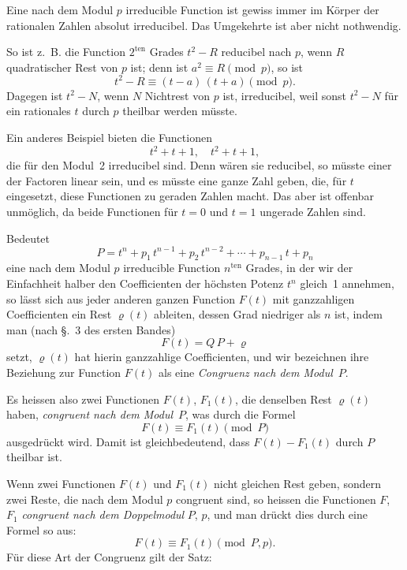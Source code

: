 \documentclass[12pt,a4paper]{article}
\begin{document}
Eine nach dem Modul $p$ irreducible Function ist gewiss immer im Körper der rationalen Zahlen absolut irreducibel. Das Umgekehrte ist aber nicht nothwendig.

So ist z.~B. die Function $2^{\text{ten}}$ Grades $t^{2} - R$ reducibel nach $p$, wenn $R$ quadratischer Rest von $p$ ist; denn ist $a^{2} \equiv R \pmod{p}$, so ist
\[
t^{2} - R \equiv (t-a)\,(t+a) \pmod{p}.
\]
Dagegen ist $t^{2} - N$, wenn $N$ Nichtrest von $p$ ist, irreducibel, weil sonst $t^{2} - N$ für ein rationales $t$ durch $p$ theilbar werden müsste.

Ein anderes Beispiel bieten die Functionen
\[
t^{2} + t + 1,\quad t^{2} + t + 1,
\]
die für den Modul~2 irreducibel sind. Denn wären sie reducibel, so müsste einer der Factoren linear sein, und es müsste eine ganze Zahl geben, die, für $t$ eingesetzt, diese Functionen zu geraden Zahlen macht. Das aber ist offenbar unmöglich, da beide Functionen für $t = 0$ und $t = 1$ ungerade Zahlen sind.

\newpage
{}

Bedeutet
\begin{equation}\label{eq:63.3}
\tag{3}
P = t^{n} + p_{1}\,t^{n-1} + p_{2}\,t^{n-2} + \cdots + p_{n-1}\,t + p_{n}
\end{equation}
eine nach dem Modul $p$ irreducible Function $n^{\text{ten}}$ Grades, in der wir der Einfachheit halber den Coefficienten der höchsten Potenz $t^{n}$ gleich~1 annehmen, so lässt sich aus jeder anderen ganzen Function $F(t)$ mit ganzzahligen Coefficienten ein Rest $\varrho(t)$ ableiten, dessen Grad niedriger als $n$ ist, indem man (nach \S.~3 des ersten Bandes)
\begin{equation}\label{eq:63.4}
\tag{4}
F(t) = Q\,P + \varrho
\end{equation}
setzt, $\varrho(t)$ hat hierin ganzzahlige Coefficienten, und wir bezeichnen ihre Beziehung zur Function $F(t)$ als eine \emph{Congruenz nach dem Modul}~$P$.

Es heissen also zwei Functionen $F(t)$, $F_{1}(t)$, die denselben Rest $\varrho(t)$ haben, \emph{congruent nach dem Modul}~$P$, was durch die Formel
\[
F(t) \equiv F_{1}(t) \pmod{P}
\]
ausgedrückt wird. Damit ist gleichbedeutend, dass $F(t) - F_{1}(t)$ durch $P$ theilbar ist.

Wenn zwei Functionen $F(t)$ und $F_{1}(t)$ nicht gleichen Rest geben, sondern zwei Reste, die nach dem Modul $p$ congruent sind, so heissen die Functionen $F$, $F_{1}$ \emph{congruent nach dem Doppelmodul} $P$, $p$, und man drückt dies durch eine Formel so aus:
\begin{equation}\label{eq:63.5}
\tag{5}
F(t) \equiv F_{1}(t) \pmod{P, p}.
\end{equation}
Für diese Art der Congruenz gilt der Satz:
\end{document}
